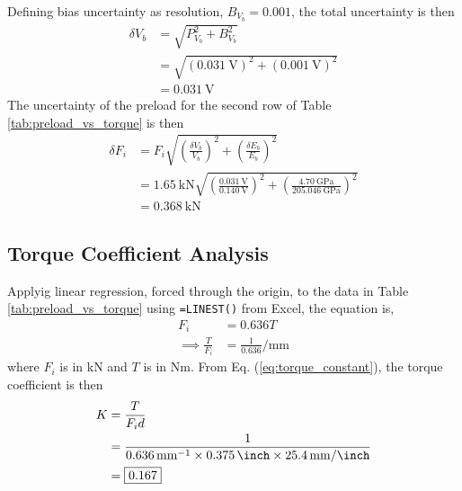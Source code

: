Defining bias uncertainty as resolution, $B_{V_b} = 0.001$, the total uncertainty is then
\begin{align*}
    \delta V_b &= \sqrt{P_{V_b}^2 + B_{V_b}^2} \\
    &= \sqrt{(\qty{0.031}{\volt})^2 + (\qty{0.001}{\volt})^2} \\
    &= \qty{0.031}{\volt}
\end{align*}
The uncertainty of the preload for the second row of Table \ref{tab:preload_vs_torque} is then
\begin{align*}
    \delta F_i &= F_i \sqrt{\left(\frac{\delta V_b}{V_b}\right)^2 + \left(\frac{\delta E_b}{E_b}\right)^2} \\
    &= \qty{1.65}{\kilo\newton} \sqrt{\left(\frac{\qty{0.031}{\volt}}{\qty{0.140}{\volt}}\right)^2 + \left(\frac{\qty{4.70}{\giga\pascal}}{\qty{205.046}{\giga\pascal}}\right)^2} \\
    &= \qty{0.368}{\kilo\newton}
\end{align*}

\subsection{Torque Coefficient Analysis}
Applyig linear regression, forced through the origin, to the data in Table \ref{tab:preload_vs_torque} using \texttt{=LINEST()} from Excel, the equation is,
\begin{align*}
    F_i &= 0.636 T \\
    \implies \frac{T}{F_i} &= \frac{1}{0.636} \unit{\per\milli\meter}
\end{align*}
where $F_i$ is in kN and $T$ is in Nm. From Eq. (\ref{eq:torque_constant}), the torque coefficient is then
\begin{align*}
    K &= \frac{T}{F_i d} \\
    &= \frac{1}{\qty{0.636}{\per\milli\meter} \times \qty{0.375}{\inch} \times \qty{25.4}{\milli\meter\per\inch}} \\
    &= \boxed{\qty{0.167}{}}
\end{align*}


